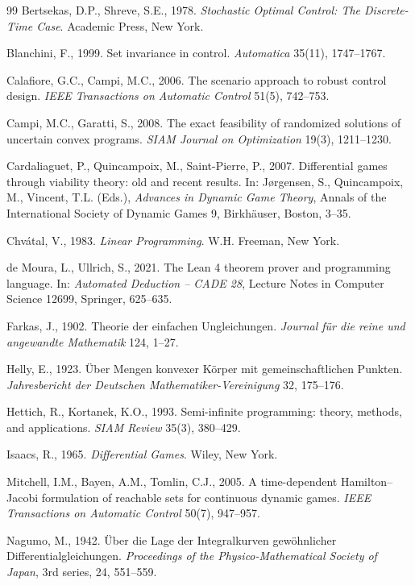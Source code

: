 \begin{thebibliography}{99}
 Bertsekas, D.P., Shreve, S.E., 1978. \emph{Stochastic Optimal Control: The Discrete-Time Case}. Academic Press, New York.

 Blanchini, F., 1999. Set invariance in control. \emph{Automatica} 35(11), 1747--1767.

 Calafiore, G.C., Campi, M.C., 2006. The scenario approach to robust control design. \emph{IEEE Transactions on Automatic Control} 51(5), 742--753.

 Campi, M.C., Garatti, S., 2008. The exact feasibility of randomized solutions of uncertain convex programs. \emph{SIAM Journal on Optimization} 19(3), 1211--1230.

 Cardaliaguet, P., Quincampoix, M., Saint-Pierre, P., 2007. Differential games through viability theory: old and recent results. In: J{\o}rgensen, S., Quincampoix, M., Vincent, T.L. (Eds.), \emph{Advances in Dynamic Game Theory}, Annals of the International Society of Dynamic Games 9, Birkh\"auser, Boston, 3--35.

 Chv\'atal, V., 1983. \emph{Linear Programming}. W.H. Freeman, New York.

 de Moura, L., Ullrich, S., 2021. The Lean 4 theorem prover and programming language. In: \emph{Automated Deduction -- CADE 28}, Lecture Notes in Computer Science 12699, Springer, 625--635.

 Farkas, J., 1902. Theorie der einfachen Ungleichungen. \emph{Journal f\"ur die reine und angewandte Mathematik} 124, 1--27.

 Helly, E., 1923. \"Uber Mengen konvexer K\"orper mit gemeinschaftlichen Punkten. \emph{Jahresbericht der Deutschen Mathematiker-Vereinigung} 32, 175--176.

 Hettich, R., Kortanek, K.O., 1993. Semi-infinite programming: theory, methods, and applications. \emph{SIAM Review} 35(3), 380--429.

 Isaacs, R., 1965. \emph{Differential Games}. Wiley, New York.

 Mitchell, I.M., Bayen, A.M., Tomlin, C.J., 2005. A time-dependent Hamilton--Jacobi formulation of reachable sets for continuous dynamic games. \emph{IEEE Transactions on Automatic Control} 50(7), 947--957.

 Nagumo, M., 1942. \"Uber die Lage der Integralkurven gew\"ohnlicher Differentialgleichungen. \emph{Proceedings of the Physico-Mathematical Society of Japan}, 3rd series, 24, 551--559.


\end{thebibliography}
